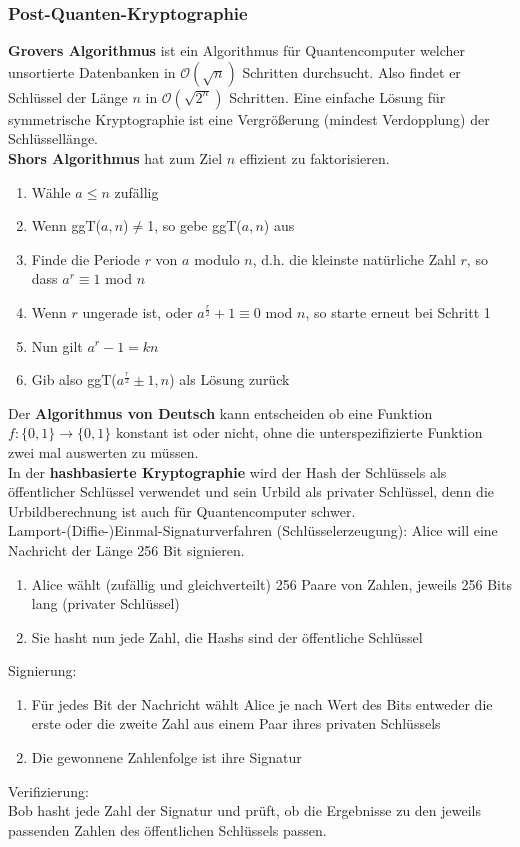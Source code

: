 \documentclass[a4paper,12pt,leqno]{article}
\begin{document}
\subsubsection{Post-Quanten-Kryptographie}
\textbf{Grovers Algorithmus} ist ein Algorithmus für Quantencomputer welcher unsortierte Datenbanken in $\mathcal{O}(\sqrt{n})$ Schritten durchsucht. Also findet er Schlüssel der Länge $n$ in $\mathcal{O}(\sqrt{2^n})$ Schritten. Eine einfache Lösung für symmetrische Kryptographie ist eine Vergrößerung (mindest Verdopplung) der Schlüssellänge.\\ 

\textbf{Shors Algorithmus} hat zum Ziel $n$ effizient zu faktorisieren.
\begin{enumerate}
\item Wähle $a\leq n$ zufällig
\item Wenn ggT($a,n$)$\neq$1, so gebe ggT($a,n$) aus
\item Finde die Periode $r$ von $a$ modulo $n$, d.h. die kleinste natürliche Zahl $r$, so dass $a^r\equiv 1$ mod $n$
\item Wenn $r$ ungerade ist, oder $a^{\frac{r}{2}} + 1\equiv 0$ mod $n$, so starte erneut bei Schritt 1
\item Nun gilt $a^r-1=kn$
\item Gib also ggT($a^{\frac{r}{2}}\pm 1,n$) als Lösung zurück
\end{enumerate}

Der \textbf{Algorithmus von Deutsch} kann entscheiden ob eine Funktion $f: \{0,1\}\rightarrow\{0,1\}$ konstant ist oder nicht, ohne die unterspezifizierte Funktion zwei mal auswerten zu müssen.\\

In der \textbf{hashbasierte Kryptographie} wird der Hash der Schlüssels als öffentlicher Schlüssel verwendet und sein Urbild als privater Schlüssel, denn die Urbildberechnung ist auch für Quantencomputer schwer.\\
Lamport-(Diffie-)Einmal-Signaturverfahren (Schlüsselerzeugung):
Alice will eine Nachricht der Länge 256 Bit signieren.
\begin{enumerate}
\item Alice wählt (zufällig und gleichverteilt) 256 Paare von Zahlen, jeweils 256 Bits lang (privater Schlüssel)
\item Sie hasht nun jede Zahl, die Hashs sind der öffentliche Schlüssel
\end{enumerate}
Signierung:
\begin{enumerate}
\item Für jedes Bit der Nachricht wählt Alice je nach Wert des Bits entweder die erste oder die zweite Zahl aus einem Paar ihres privaten Schlüssels
\item Die gewonnene Zahlenfolge ist ihre Signatur
\end{enumerate}
Verifizierung:\\
Bob hasht jede Zahl der Signatur und prüft, ob die Ergebnisse zu den jeweils passenden Zahlen des öffentlichen Schlüssels passen.\\
\end{document}
